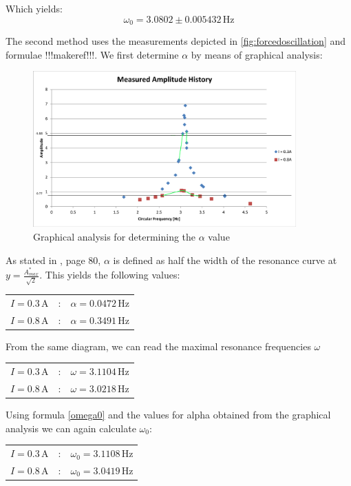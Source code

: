 \documentclass{scrreprt}
\newcommand{\unit}[1]{\ensuremath{\, \mathrm{#1}}}
\begin{document}
Which yields:
\begin{equation}
\omega_0 = 3.0802 \pm 0.005432 \unit{Hz}
\end{equation}

The second method uses the measurements depicted in \ref{fig:forcedoscillation} and formulae !!!makeref!!!.
We first determine $\alpha$ by means of graphical analysis:

\begin{figure}[H]
	\centering
  \includegraphics[width=0.9\textwidth]{diag/Width_measurement.png}
	\caption{Graphical analysis for determining the $\alpha$ value}
	\label{fig:graphical}
\end{figure}

As stated in \cite{physcript13}, page 80, $\alpha$ is defined as half the width of the resonance curve at $y=\frac{A^*_{max}}{\sqrt{2}}$. This yields the following values:

\begin{table}[H]
\center
\begin{tabular}{lcl}
$I = 0.3 \unit{A}$ &:& $\alpha = 0.0472\unit{Hz}$\\
$I = 0.8 \unit{A}$ &:& $\alpha = 0.3491\unit{Hz}$
\end{tabular}
\end{table}

From the same diagram, we can read the maximal resonance frequencies $\omega$

\begin{table}[H]
\center
\begin{tabular}{lcl}
$I = 0.3 \unit{A}$ &:& $\omega = 3.1104\unit{Hz}$\\
$I = 0.8 \unit{A}$ &:& $\omega = 3.0218\unit{Hz}$
\end{tabular}
\end{table}

Using formula \ref{omega0} and the values for alpha obtained from the graphical analysis we can again calculate $\omega_0$:
\begin{table}[H]
\center
\begin{tabular}{lcl}
$I = 0.3 \unit{A}$ &:& $\omega_0 = 3.1108\unit{Hz}$\\
$I = 0.8 \unit{A}$ &:& $\omega_0 = 3.0419
\unit{Hz}$
\end{tabular}
\end{table}
\end{document}
